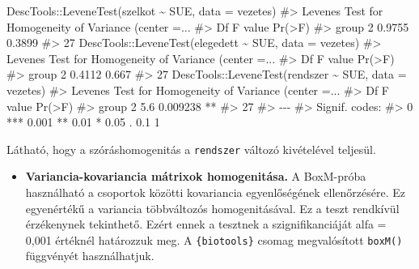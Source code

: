 \documentclass[
  letterpaper,
]{krantz}
\makeatletter
\newenvironment{Shaded}{\begin{snugshade}}{\end{snugshade}}
\newcommand{\AttributeTok}[1]{\textcolor[rgb]{0.40,0.45,0.13}{#1}}
\newcommand{\CommentTok}[1]{\textcolor[rgb]{0.37,0.37,0.37}{#1}}
\newcommand{\FunctionTok}[1]{\textcolor[rgb]{0.28,0.35,0.67}{#1}}
\newcommand{\NormalTok}[1]{\textcolor[rgb]{0.00,0.23,0.31}{#1}}
\newcommand{\SpecialCharTok}[1]{\textcolor[rgb]{0.37,0.37,0.37}{#1}}
\providecommand{\tightlist}{%
  \setlength{\itemsep}{0pt}\setlength{\parskip}{0pt}}\usepackage{longtable,booktabs,array}
\newenvironment{kframe}{%
\medskip{}
\setlength{\fboxsep}{.8em}
 \def\at@end@of@kframe{}%
 \ifinner\ifhmode%
  \def\at@end@of@kframe{\end{minipage}}%
  \begin{minipage}{\columnwidth}%
 \fi\fi%
 \def\FrameCommand##1{\hskip\@totalleftmargin \hskip-\fboxsep
 \colorbox{shadecolor}{##1}\hskip-\fboxsep
     \hskip-\linewidth \hskip-\@totalleftmargin \hskip\columnwidth}%
 \MakeFramed {\advance\hsize-\width
   \@totalleftmargin\z@ \linewidth\hsize
   \@setminipage}}%
 {\par\unskip\endMakeFramed%
 \at@end@of@kframe}
\renewenvironment{Shaded}{\begin{kframe}}{\end{kframe}}
\makeatother
\begin{document}
\begin{Shaded}
\begin{Highlighting}[]
\NormalTok{DescTools}\SpecialCharTok{::}\FunctionTok{LeveneTest}\NormalTok{(szelkot }\SpecialCharTok{\textasciitilde{}}\NormalTok{ SUE, }\AttributeTok{data =}\NormalTok{ vezetes)}
\CommentTok{\#\textgreater{} Levene\textquotesingle{}s Test for Homogeneity of Variance (center =...}
\CommentTok{\#\textgreater{}       Df F value Pr(\textgreater{}F)}
\CommentTok{\#\textgreater{} group  2  0.9755 0.3899}
\CommentTok{\#\textgreater{}       27}
\NormalTok{DescTools}\SpecialCharTok{::}\FunctionTok{LeveneTest}\NormalTok{(elegedett }\SpecialCharTok{\textasciitilde{}}\NormalTok{ SUE, }\AttributeTok{data =}\NormalTok{ vezetes)}
\CommentTok{\#\textgreater{} Levene\textquotesingle{}s Test for Homogeneity of Variance (center =...}
\CommentTok{\#\textgreater{}       Df F value Pr(\textgreater{}F)}
\CommentTok{\#\textgreater{} group  2  0.4112  0.667}
\CommentTok{\#\textgreater{}       27}
\NormalTok{DescTools}\SpecialCharTok{::}\FunctionTok{LeveneTest}\NormalTok{(rendszer }\SpecialCharTok{\textasciitilde{}}\NormalTok{ SUE, }\AttributeTok{data =}\NormalTok{ vezetes)}
\CommentTok{\#\textgreater{} Levene\textquotesingle{}s Test for Homogeneity of Variance (center =...}
\CommentTok{\#\textgreater{}       Df F value   Pr(\textgreater{}F)   }
\CommentTok{\#\textgreater{} group  2     5.6 0.009238 **}
\CommentTok{\#\textgreater{}       27                    }
\CommentTok{\#\textgreater{} {-}{-}{-}}
\CommentTok{\#\textgreater{} Signif. codes:  }
\CommentTok{\#\textgreater{} 0 \textquotesingle{}***\textquotesingle{} 0.001 \textquotesingle{}**\textquotesingle{} 0.01 \textquotesingle{}*\textquotesingle{} 0.05 \textquotesingle{}.\textquotesingle{} 0.1 \textquotesingle{} \textquotesingle{} 1}
\end{Highlighting}
\end{Shaded}

Látható, hogy a szóráshomogenitás a \texttt{rendszer} változó
kivételével teljesül.

\begin{itemize}
\tightlist
\item
  \textbf{Variancia-kovariancia mátrixok homogenitása.} A BoxM-próba
  használható a csoportok közötti kovariancia egyenlőségének
  ellenőrzésére. Ez egyenértékű a variancia többváltozós
  homogenitásával. Ez a teszt rendkívül érzékenynek tekinthető. Ezért
  ennek a tesztnek a szignifikanciáját alfa = 0,001 értéknél határozzuk
  meg. A \texttt{\{biotools\}} csomag megvalósított \texttt{boxM()}
  függvényét használhatjuk.
\end{itemize}
\end{document}
